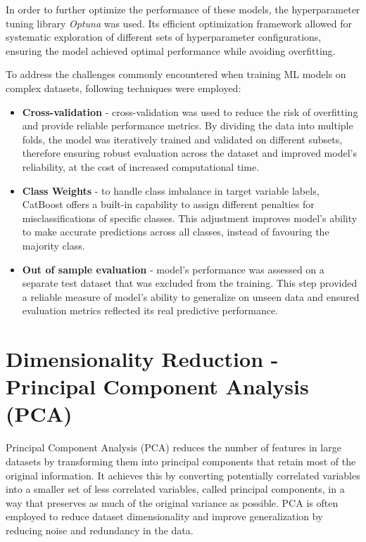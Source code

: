 In order to further optimize the performance of these models, the
hyperparameter tuning library \textit{Optuna} was used. Its efficient
optimization framework allowed for systematic exploration of different sets of
hyperparameter configurations, ensuring the model achieved optimal performance while avoiding
overfitting. 

To address the challenges commonly encountered when training ML models on
complex datasets, following techniques were employed:
\begin{itemize}
  \item \textbf{Cross-validation} - cross-validation was used to reduce the
    risk of overfitting and provide reliable performance metrics. By dividing
    the data into multiple folds, the model was iteratively trained and
    validated on different subsets, therefore ensuring robust evaluation across
    the dataset and improved model's reliability, at the cost of increased
    computational time.
  \item \textbf{Class Weights} - to handle class imbalance in target variable
    labels, CatBoost offers a built-in capability to assign different penalties
    for misclassifications of specific classes. This adjustment improves
    model's ability to make accurate predictions across all classes, instead of
    favouring the majority class.
  \item \textbf{Out of sample evaluation} - model's performance was assessed on
    a separate test dataset that was excluded from the training. This step
    provided a reliable measure of model's ability to generalize on unseen data
    and ensured evaluation metrics  reflected its real predictive performance.
\end{itemize}

\section{Dimensionality Reduction - Principal Component Analysis (PCA)}
\label{sec:dimensionalityreduction}

Principal Component Analysis (PCA) reduces the number of features in large
datasets by transforming them into principal components that retain most of the
original information. It achieves this by converting potentially correlated
variables into a smaller set of less correlated variables, called principal
components, in a way that preserves as much of the original variance as
possible\cite{pca}. PCA is often employed to reduce dataset dimensionality and improve
generalization by reducing noise and redundancy in the data.

